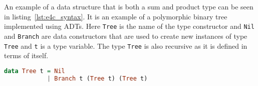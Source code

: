 \documentclass[10pt]{report}
\newcommand{\KIKO}[1]{\textcolor{red}{\textbf{[Kiko: #1]}}}
\def\code#1{\texttt{#1}} %
\begin{document}
\par{An example of a data structure that is both a sum and product type can be seen in listing~\ref{lst:e4c_syntax}. It is an example of a polymorphic binary tree implemented using ADTs. Here \code{Tree} is the name of the type constructor and \code{Nil} and \code{Branch} are data constructors that are used to create new instances of type \code{Tree} and \code{t} is a type variable. The type \code{Tree} is also recursive as it is defined in terms of itself.}


\begin{lstlisting}[language=Haskell,caption={Binary tree definition in Haskell},label={lst:e4c_syntax}]
data Tree t = Nil
            | Branch t (Tree t) (Tree t)
\end{lstlisting}


\end{document}

